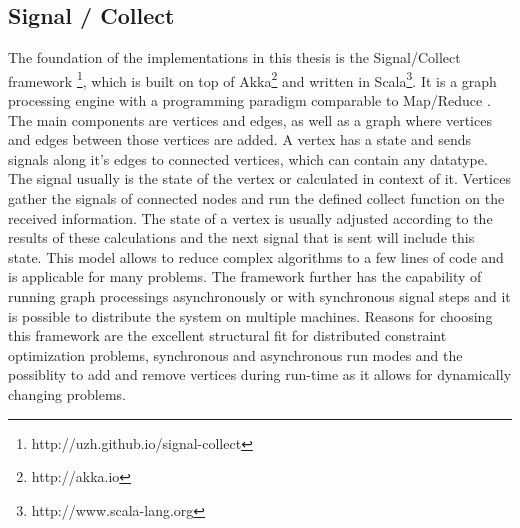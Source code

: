 \subsection{Signal / Collect}
The foundation of the implementations in this thesis is the Signal/Collect framework \cite{Stutz2010}\footnote{http://uzh.github.io/signal-collect}, which is built on top of Akka\footnote{http://akka.io} and written in Scala\footnote{http://www.scala-lang.org}. It is a graph processing engine with a programming paradigm comparable to Map/Reduce \cite{Dean}. The main components are vertices and edges, as well as a graph where vertices and edges between those vertices are added. A vertex has a state and sends signals along it's edges to connected vertices, which can contain any datatype. The signal usually is the state of the vertex or calculated in context of it. Vertices gather the signals of connected nodes and run the defined collect function on the received information. The state of a vertex is usually adjusted according to the results of these calculations and the next signal that is sent will include this state.  This model allows to reduce complex algorithms to a few lines of code and is applicable for many problems. The framework further has the capability of running graph processings asynchronously or with synchronous signal steps and it is possible to distribute the system on multiple machines. Reasons for choosing this framework are the excellent structural fit for distributed constraint optimization problems, synchronous and asynchronous run modes and the possiblity to add and remove vertices during run-time as it allows for dynamically changing problems.

